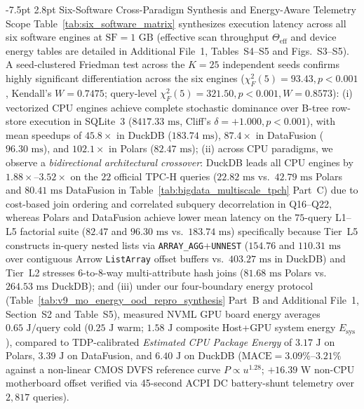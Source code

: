 \documentclass[10pt,a4paper]{article}
\makeatletter
\renewcommand\subsection{\@startsection{subsection}{2}{\z@}%
  {-7.5pt \@plus -2pt \@minus -1pt}%
  {2.8pt \@plus 1pt}%
  {\normalfont\normalsize\bfseries}}
\makeatother
\begin{document}
\subsection{Six-Software Cross-Paradigm Synthesis and Energy-Aware Telemetry Scope}
Table~\ref{tab:six_software_matrix} synthesizes execution latency across all six software engines at $\text{SF}=1\text{ GB}$ (effective scan throughput $\Theta_{\text{eff}}$ and device energy tables are detailed in Additional File~1, Tables~S4--S5 and Figs.~S3--S5). A seed-clustered Friedman test across the $K=25$ independent seeds confirms highly significant differentiation across the six engines ($\chi^2_F(5) = 93.43, p < 0.001$, Kendall's $W = 0.7475$; query-level $\chi^2_F(5) = 321.50, p < 0.001, W = 0.8573$): (i) vectorized CPU engines achieve complete stochastic dominance over B-tree row-store execution in SQLite~3 ($8417.33\text{ ms}$, Cliff's $\delta = +1.000, p < 0.001$), with mean speedups of $45.8\times$ in DuckDB ($183.74\text{ ms}$), $87.4\times$ in DataFusion ($96.30\text{ ms}$), and $102.1\times$ in Polars ($82.47\text{ ms}$); (ii) across CPU paradigms, we observe a \emph{bidirectional architectural crossover}: DuckDB leads all CPU engines by $1.88\times\text{--}3.52\times$ on the $22$ official TPC-H queries ($22.82\text{ ms}$ vs.\ $42.79\text{ ms}$ Polars and $80.41\text{ ms}$ DataFusion in Table~\ref{tab:bigdata_multiscale_tpch} Part~C) due to cost-based join ordering and correlated subquery decorrelation in Q16--Q22, whereas Polars and DataFusion achieve lower mean latency on the $75$-query L1--L5 factorial suite ($82.47$ and $96.30\text{ ms}$ vs.\ $183.74\text{ ms}$) specifically because Tier~L5 constructs in-query nested lists via \texttt{ARRAY\_AGG}+\texttt{UNNEST} ($154.76$ and $110.31\text{ ms}$ over contiguous Arrow \texttt{ListArray} offset buffers vs.\ $403.27\text{ ms}$ in DuckDB) and Tier~L2 stresses 6-to-8-way multi-attribute hash joins ($81.68\text{ ms}$ Polars vs.\ $264.53\text{ ms}$ DuckDB); and (iii) under our four-boundary energy protocol (Table~\ref{tab:v9_mo_energy_ood_repro_synthesis} Part~B and Additional File~1, Section~S2 and Table~S5), measured NVML GPU board energy averages $0.65\text{ J/query}$ cold ($0.25\text{ J}$ warm; $1.58\text{ J}$ composite Host+GPU system energy $E_{\text{sys}}$), compared to TDP-calibrated \emph{Estimated CPU Package Energy} of $3.17\text{ J}$ on Polars, $3.39\text{ J}$ on DataFusion, and $6.40\text{ J}$ on DuckDB ($\text{MACE}=3.09\%\text{--}3.21\%$ against a non-linear CMOS DVFS reference curve $P\propto u^{1.28}$; $+16.39\text{ W}$ non-CPU motherboard offset verified via 45-second ACPI DC battery-shunt telemetry over $2{,}817$ queries).
\end{document}

